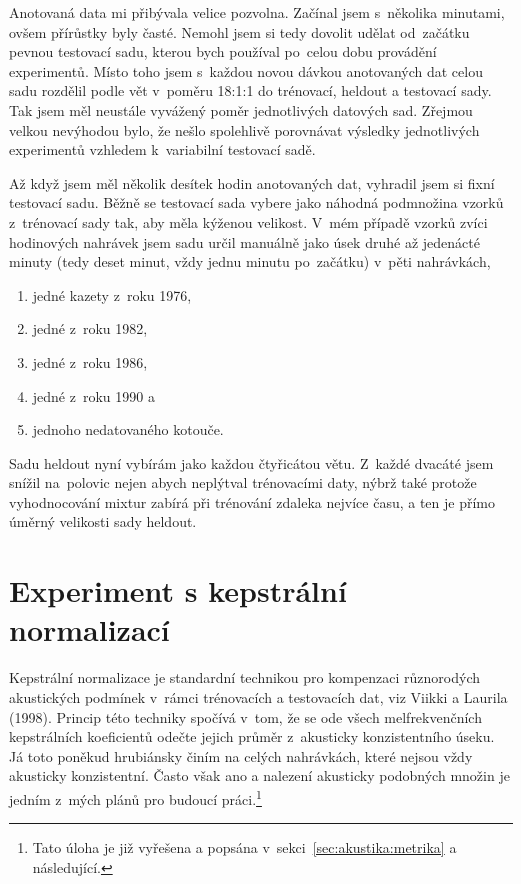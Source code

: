 Anotovaná data mi přibývala velice pozvolna. Začínal jsem s~několika minutami,
ovšem přírůstky byly časté. Nemohl jsem si tedy dovolit udělat od~začátku pevnou
testovací sadu, kterou bych používal po~celou dobu provádění experimentů. Místo
toho jsem s~každou novou dávkou anotovaných dat celou sadu rozdělil podle vět
v~poměru 18:1:1 do trénovací, heldout a testovací sady. Tak jsem měl neustále
vyvážený poměr jednotlivých datových sad. Zřejmou velkou nevýhodou bylo, že
nešlo spolehlivě porovnávat výsledky jednotlivých experimentů vzhledem
k~variabilní testovací sadě.

Až když jsem měl několik desítek hodin anotovaných dat, vyhradil jsem si fixní
testovací sadu. Běžně se testovací sada vybere jako náhodná podmnožina vzorků
z~trénovací sady tak, aby měla kýženou velikost. V~mém případě vzorků zvíci
hodinových nahrávek jsem sadu určil manuálně jako úsek druhé až jedenácté minuty
(tedy deset minut, vždy jednu minutu po~začátku) v~pěti nahrávkách,
\begin{enumerate}
\item{jedné kazety z~roku 1976,}
\item{jedné z~roku 1982,}
\item{jedné z~roku 1986,}
\item{jedné z~roku 1990 a}
\item{jednoho nedatovaného kotouče.}
\end{enumerate}

Sadu heldout nyní vybírám jako každou čtyřicátou větu. Z~každé dvacáté jsem
snížil na~polovic nejen abych neplýtval trénovacími daty, nýbrž také protože
vyhodnocování mixtur zabírá při trénování zdaleka nejvíce času, a ten je přímo
úměrný velikosti sady heldout.

\section{Experiment s kepstrální normalizací}
\label{sec:mfcc-norm}

Kepstrální normalizace je standardní technikou pro kompenzaci různorodých
akustických podmínek v~rámci trénovacích a testovacích dat, viz Viikki a Laurila
(1998)\cite{viikki1998cepstral}. Princip této techniky spočívá v~tom, že se ode
všech melfrekvenčních kepstrálních koeficientů odečte jejich průměr z~akusticky
konzistentního úseku. Já toto poněkud hrubiánsky činím na celých nahrávkách,
které nejsou vždy akusticky konzistentní. Často však ano a nalezení akusticky
podobných množin je jedním z~mých plánů pro budoucí práci.\footnote{Tato úloha
je již vyřešena a popsána v~sekci~\ref{sec:akustika:metrika} a následující.}


